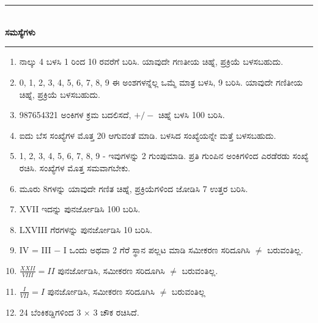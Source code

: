 \chapter[ಅಧ್ಯಾಯ 2]{}\label{chap2}

\begin{center}
\rule{5cm}{1pt}\\[5pt]
{\Large\bfseries ಸಮಸ್ಯೆಗಳು}\\[3pt]
\rule{5cm}{1pt}
\end{center}

\smallskip
\begin{enumerate}
\renewcommand{\labelenumi}{\bf\theenumi.}
\itemsep=5pt
\item ನಾಲ್ಕು 4 ಬಳಸಿ 1 ರಿಂದ 10 ರವರೆಗೆ ಬರಿಸಿ. ಯಾವುದೇ ಗಣತೀಯ ಚಿಹ್ನೆ, ಪ್ರಕ್ರಿಯೆ ಬಳಸಬಹುದು.

\item 0, 1, 2, 3, 4, 5, 6, 7, 8, 9 ಈ ಅಂಶಗಳನ್ನೆಲ್ಲ ಒಮ್ಮೆ ಮಾತ್ರ ಬಳಸಿ, 9 ಬರಿಸಿ. ಯಾವುದೇ ಗಣಿತೀಯ ಚಿಹ್ನೆ, ಪ್ರಕ್ರಿಯೆ ಬಳಸಬಹುದು. 

\item 987654321 ಅಂಕಿಗಳ ಕ್ರಮ ಬದಲಿಸದೆ, $+/-$ ಚಿಹ್ನೆ ಬಳಸಿ 100 ಬರಿಸಿ.

\item ಐದು ಬೆಸ ಸಂಖ್ಯೆಗಳ ಮೊತ್ತ 20 ಆಗುವಂತೆ ಮಾಡಿ. ಬಳಸಿದ ಸಂಖ್ಯೆಯನ್ನೇ ಮತ್ತೆ ಬಳಸಬಹುದು. 

\item 1, 2, 3, 4, 5, 6, 7, 8, 9 - ಇವುಗಳನ್ನು 2 ಗುಂಪುಮಾಡಿ. ಪ್ರತಿ ಗುಂಪಿನ ಅಂಕಿಗಳಿಂದ ಎರಡೆರಡು ಸಂಖ್ಯೆ ರಚಿಸಿ. ಸಂಖ್ಯೆಗಳ ಮೊತ್ತ ಸಮವಾಗಬೇಕು. 

\item ಮೂರು 8ಗಳನ್ನು ಯಾವುದೇ ಗಣಿತ ಚಿಹ್ನೆ, ಪ್ರಕ್ರಿಯೆಗಳಿಂದ ಜೋಡಿಸಿ 7 ಉತ್ತರ ಬರಿಸಿ.

\item XVII ಇದನ್ನು ಪುನರ್ಜೋಡಿಸಿ 100 ಬರಿಸಿ.

\item LXVIII ಗೆರಗಳನ್ನು ಪುನರ್ಜೋಡಿಸಿ 10 ಬರಿಸಿ. 

\item IV = III $-$ I ಒಂದು ಅಥವಾ 2 ಗೆರೆ ಸ್ಥಾನ ಪಲ್ಲಟ ಮಾಡಿ ಸಮೀಕರಣ ಸರಿದೂಗಿಸಿ $\neq$ ಬರುವಂತಿಲ್ಲ.

\item $\frac{XXII}{VIII} = II$ ಪುನರ್ಜೋಡಿಸಿ, ಸಮೀಕರಣ ಸರಿದೂಗಿಸಿ $\neq$ ಬರುವಂತಿಲ್ಲ.

\item $\frac{I}{VII} = I$ ಪುನರ್ಜೋಡಿಸಿ, ಸಮೀಕರಣ ಸರಿದೂಗಿಸಿ $\neq$ ಬರುವಂತಿಲ್ಲ

\item 24 ಬೆಂಕಿಕಡ್ಡಿಗಳಿಂದ 3 $\times$ 3 ಚೌಕ ರಚಿಸಿದೆ.


\end{enumerate}
